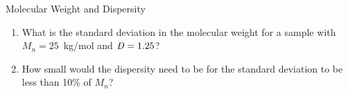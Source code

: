 \begin{activity}{Molecular Weight and Dispersity}
\begin{exercises}
			\begin{enumerate}
				\item What is the standard deviation in the molecular weight for a sample with $M_n=25$~kg/mol and $\PDImath=1.25$?
				
				\item How small would the dispersity need to be for the standard deviation to be less than 10\% of $M_n$?
			\end{enumerate}
			
\end{exercises}
	
\end{activity}